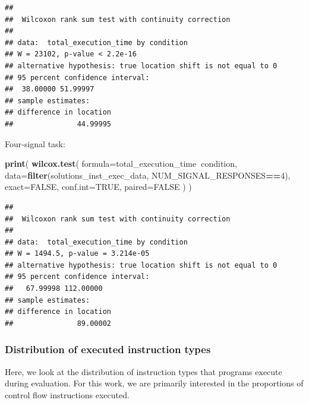 \documentclass[]{book}
\newenvironment{Shaded}{\begin{snugshade}}{\end{snugshade}}
\newcommand{\DataTypeTok}[1]{\textcolor[rgb]{0.13,0.29,0.53}{#1}}
\newcommand{\DecValTok}[1]{\textcolor[rgb]{0.00,0.00,0.81}{#1}}
\newcommand{\KeywordTok}[1]{\textcolor[rgb]{0.13,0.29,0.53}{\textbf{#1}}}
\newcommand{\NormalTok}[1]{#1}
\newcommand{\OperatorTok}[1]{\textcolor[rgb]{0.81,0.36,0.00}{\textbf{#1}}}
\newcommand{\OtherTok}[1]{\textcolor[rgb]{0.56,0.35,0.01}{#1}}
\begin{document}
\begin{verbatim}
## 
##  Wilcoxon rank sum test with continuity correction
## 
## data:  total_execution_time by condition
## W = 23102, p-value < 2.2e-16
## alternative hypothesis: true location shift is not equal to 0
## 95 percent confidence interval:
##  38.00000 51.99997
## sample estimates:
## difference in location 
##               44.99995
\end{verbatim}

Four-signal task:

\begin{Shaded}
\begin{Highlighting}[]
\KeywordTok{print}\NormalTok{(}
  \KeywordTok{wilcox.test}\NormalTok{(}
    \DataTypeTok{formula=}\NormalTok{total_execution_time}\OperatorTok{~}\NormalTok{condition,}
    \DataTypeTok{data=}\KeywordTok{filter}\NormalTok{(solutions_inst_exec_data, NUM_SIGNAL_RESPONSES}\OperatorTok{==}\DecValTok{4}\NormalTok{),}
    \DataTypeTok{exact=}\OtherTok{FALSE}\NormalTok{,}
    \DataTypeTok{conf.int=}\OtherTok{TRUE}\NormalTok{,}
    \DataTypeTok{paired=}\OtherTok{FALSE}
\NormalTok{  )}
\NormalTok{)}
\end{Highlighting}
\end{Shaded}

\begin{verbatim}
## 
##  Wilcoxon rank sum test with continuity correction
## 
## data:  total_execution_time by condition
## W = 1494.5, p-value = 3.214e-05
## alternative hypothesis: true location shift is not equal to 0
## 95 percent confidence interval:
##   67.99998 112.00000
## sample estimates:
## difference in location 
##               89.00002
\end{verbatim}

\hypertarget{distribution-of-executed-instruction-types}{%
\subsubsection{Distribution of executed instruction types}\label{distribution-of-executed-instruction-types}}

Here, we look at the distribution of instruction types that programs execute during evaluation.
For this work, we are primarily interested in the proportions of control flow instructions executed.
\end{document}
